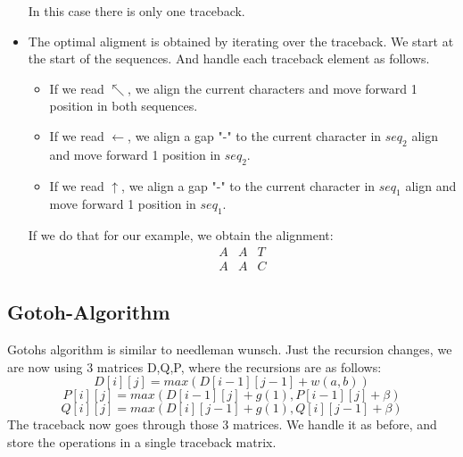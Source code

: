 \begin{itemize}
   In this case there is only one traceback.
   \item The optimal aligment is obtained by iterating over the traceback.
   We start at the start of the sequences. And handle each traceback element as follows.
   \begin{itemize}
     \item If we read $\nwarrow$, we align the current characters and move forward 1 position in both sequences.
     \item If we read $\leftarrow$, we align a gap "-" to the current character in $seq_2$ align and move forward 1 position in $seq_2$.
     \item If we read $\uparrow$, we align a gap "-" to the current character in $seq_1$ align and move forward 1 position in $seq_1$.
   \end{itemize}
   If we do that for our example, we obtain the alignment:
   $$\begin{matrix}
    A & A & T\\
    A & A & C
  \end{matrix}$$
\end{itemize}


\subsection{Gotoh-Algorithm}
\label{sec:gotoh}
Gotohs algorithm is similar to needleman wunsch.
Just the recursion changes, we are now using 3 matrices D,Q,P, where the recursions are as follows:
$$D[i][j] = max(D[i-1][j-1] + w(a,b))$$
$$P[i][j] = max(D[i-1][j] + g(1), P[i-1][j]+ \beta)$$
$$Q[i][j] = max(D[i][j-1] + g(1), Q[i][j-1]+ \beta)$$
The traceback now goes through those 3 matrices.
We handle it as before, and store the operations in a single traceback matrix.
